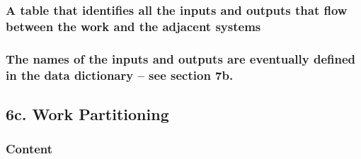 \documentclass[
]{article}
\begin{document}
\hypertarget{a-table-that-identifies-all-the-inputs-and-outputs-that-flow-between-the-work-and-the-adjacent-systems}{%
\subsubsection{A table that identifies all the inputs and outputs that
flow between the work and the adjacent
systems}\label{a-table-that-identifies-all-the-inputs-and-outputs-that-flow-between-the-work-and-the-adjacent-systems}}

\hypertarget{the-names-of-the-inputs-and-outputs-are-eventually-defined-in-the-data-dictionary-see-section-7b.}{%
\subsubsection{The names of the inputs and outputs are eventually
defined in the data dictionary -- see section
7b.}\label{the-names-of-the-inputs-and-outputs-are-eventually-defined-in-the-data-dictionary-see-section-7b.}}

\hypertarget{c.-work-partitioning}{%
\subsection{6c. Work Partitioning}\label{c.-work-partitioning}}

\hypertarget{content-24}{%
\subsubsection{Content}\label{content-24}}
\end{document}
